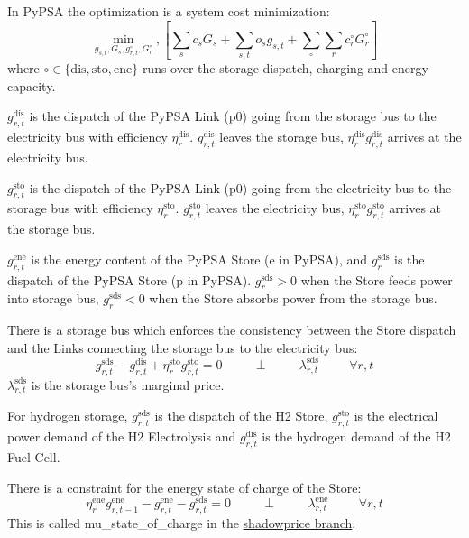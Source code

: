 \documentclass[final,3p,times]{elsarticle}
\begin{document}
In PyPSA the optimization is a system cost minimization:
\begin{equation}
  \min_{g_{s,t}, G_s,g^{\circ}_{r,t},G^{\circ}_{r}},\left[ \sum_s c_s G_s + \sum_{s,t} o_{s} g_{s,t} +\sum_{\circ}\sum_r c^{\circ}_r G^{\circ}_r\right]  \label{eq:objpypsa}
\end{equation}
where $\circ\in \{\textrm{dis},\textrm{sto},\textrm{ene}\}$ runs over the
storage dispatch, charging and energy capacity.

$g^{\textrm{dis}}_{r,t}$ is the dispatch of the PyPSA Link (p0) going from the
storage bus to the electricity bus with efficiency $\eta^{\textrm{dis}}_r$.
$g^{\textrm{dis}}_{r,t}$ leaves the storage bus,
$\eta^{\textrm{dis}}_rg^{\textrm{dis}}_{r,t}$ arrives at the electricity bus.

$g^{\textrm{sto}}_{r,t}$ is the dispatch of the PyPSA Link (p0) going from the
electricity bus to the storage bus with efficiency $\eta^{\textrm{sto}}_r$.
$g^{\textrm{sto}}_{r,t}$ leaves the electricity bus,
$\eta^{\textrm{sto}}_rg^{\textrm{sto}}_{r,t}$ arrives at the storage bus.

$g^{\textrm{ene}}_{r,t}$ is the energy content of the PyPSA Store (e in PyPSA),
and $g^{\textrm{sds}}_r$ is the dispatch of the PyPSA Store (p in PyPSA).
$g^{\textrm{sds}}_r > 0$ when the Store feeds power into storage bus,
$g^{\textrm{sds}}_r < 0$ when the Store absorbs power from the storage bus.

There is a storage bus which enforces the consistency between the Store dispatch
and the Links connecting the storage bus to the electricity bus:
\begin{equation}
  g^{\textrm{sds}}_{r,t} - g^{\textrm{dis}}_{r,t} + \eta^{\textrm{sto}}_r g^{\textrm{sto}}_{r,t} = 0  \hspace{1cm}\perp \hspace{1cm} \lambda^{\textrm{sds}}_{r,t} \hspace{1cm} \forall r,t \label{eq:biddingconstraint}
\end{equation}
$\lambda^{\textrm{sds}}_{r,t}$ is the storage bus's marginal price.

For hydrogen storage, $g^{\textrm{sds}}_{r,t}$ is the dispatch of the H2 Store,
$g^{\textrm{sto}}_{r,t}$ is the electrical power demand of the H2 Electrolysis
and $g^{\textrm{dis}}_{r,t}$ is the hydrogen demand of the H2 Fuel Cell.

There is a constraint for the energy state of charge of the Store:
\begin{equation}
  \eta^{\textrm{ene}}_r g^{\textrm{ene}}_{r,t-1} - g^{\textrm{ene}}_{r,t} - g^{\textrm{sds}}_{r,t} = 0  \hspace{1cm}\perp \hspace{1cm} \lambda^{\textrm{ene}}_{r,t} \hspace{1cm} \forall r,t  \label{eq:soc3}
\end{equation}
This is called mu\_state\_of\_charge in the
\href{https://github.com/PyPSA/PyPSA/blob/shadowprices/pypsa/linopf.py}{shadowprice
branch}.
\end{document}
